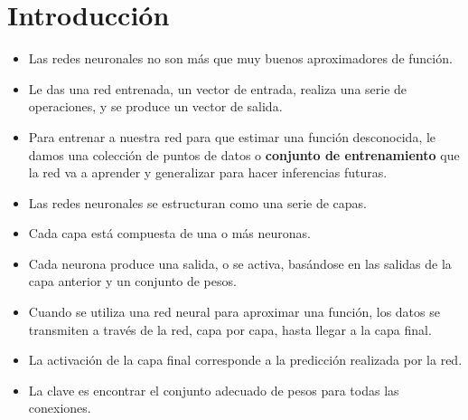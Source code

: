\section{Introducción}
\begin{frame}{\titulo}{\subtitulo}
    \begin{itemize}
        \item Las redes neuronales no son más que muy buenos aproximadores de función.\bigskip

        \item Le das una red entrenada, un vector de entrada, realiza una serie de operaciones, y se produce un vector de salida.\bigskip

        \item Para entrenar a nuestra red para que estimar una función desconocida, le damos una colección de puntos de datos o {\bf conjunto de entrenamiento} que la red va a aprender y generalizar para hacer inferencias futuras.
    \end{itemize}
\end{frame}

\begin{frame}{\titulo}{\subtitulo}
    \begin{itemize}
        \item Las redes neuronales se estructuran como una serie de capas.\bigskip

        \item Cada capa está compuesta de una o más neuronas.\bigskip

        \item Cada neurona produce una salida, o se activa, basándose en las salidas de la capa anterior y un conjunto de pesos.
    \end{itemize}
    \begin{figure}[H]
        \centering
        \scalebox{0.6}{}
    \end{figure}
\end{frame}

\begin{frame}{\titulo}{\subtitulo}
    \begin{itemize}
        \item Cuando se utiliza una red neural para aproximar una función, los datos se transmiten a través de la red, capa por capa, hasta llegar a la capa final.\bigskip

        \item La activación de la capa final corresponde a la predicción realizada por la red.\bigskip

        \item La clave es encontrar el conjunto adecuado de pesos para todas las conexiones.
    \end{itemize}
\end{frame}

